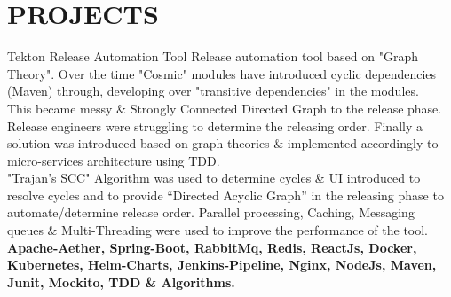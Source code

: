 \documentclass[]{cv-class}
\begin{document}
\section{PROJECTS}
\begin{entrylist}
    \entry
    {}
	{Tekton}
    {Release Automation Tool}
	{Release automation tool based on "Graph Theory". Over the time "Cosmic" modules have introduced cyclic dependencies (Maven) through, developing over "transitive dependencies" in the modules.
	\\
	This became messy \& Strongly Connected Directed Graph to the release phase. Release engineers were struggling to determine the releasing order. Finally a solution was introduced based on graph theories \& implemented accordingly to micro-services architecture using TDD.
	\\
	"Trajan’s SCC" Algorithm was used to determine cycles \& UI introduced to resolve cycles and to provide “Directed Acyclic Graph”
	in the releasing phase to automate/determine release order.
	Parallel processing, Caching, Messaging queues \& Multi-Threading were used to improve the performance of the tool.
	\\
    \textbf{Apache-Aether, Spring-Boot, RabbitMq, Redis, ReactJs, Docker, Kubernetes, Helm-Charts, Jenkins-Pipeline, Nginx, NodeJs, Maven, Junit, Mockito, TDD \& Algorithms.}
	}
	\\
	\end{entrylist}
\newpage
\begin{aside}
\end{aside}
\end{document}
